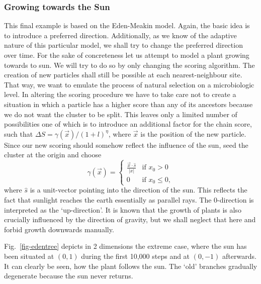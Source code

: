 \documentclass[twocolumn, 10pt]{scrartcl}
\begin{document}
            \subsubsection{Growing towards the Sun}
                This final example is based on the Eden-Meakin model. Again, the basic idea is to introduce a preferred
                direction. Additionally, as we know of the adaptive nature of this particular model, we shall try to
                change the preferred direction over time. For the sake of concreteness let us attempt to model a plant
                growing towards to sun. We will try to do so by only changing the scoring algorithm. The creation of
                new particles shall still be possible at each nearest-neighbour site. That way, we want to emulate the
                process of natural selection on a microbiologic level. In altering the scoring procedure we have to take
                care not to create a situation in which a particle has a higher score than any of its ancestors because
                we do not want the cluster to be split. This leaves only a limited number of possibilities one of which
                is to introduce an additional factor for the chain score, such that $\Delta S=\gamma(\vec x)/(1+l)^\eta$,
                where $\vec x$ is the position of the new particle. Since our new scoring should somehow reflect the
                influence of the sun, seed the cluster at the origin and choose
                \begin{equation*}
                    \gamma(\vec x)=
                    \begin{cases}
                            \frac{\vec x\cdot \hat s}{|x|}  & \text{if $x_0>0$} \\
                            0 & \text{if $x_0\le 0$},
                    \end{cases}
                \end{equation*}
                where $\hat s$ is a unit-vector pointing into the direction of the sun. This reflects the fact
                that sunlight reaches the earth essentially as parallel rays. The 0-direction is
                interpreted as the `up-direction'. It is known that the growth
                of plants is also crucially influenced by the direction of gravity, but we shall neglect that here
                and forbid growth downwards manually.

                Fig.~\ref{fig-edentree} depicts in 2 dimensions the extreme case, where the sun has been situated
                at $(0,1)$ during the first 10,000 steps and at $(0, -1)$ afterwards. It can clearly be seen, how
                the plant follows the sun. The `old' branches gradually degenerate because the sun never returns.
\end{document}
